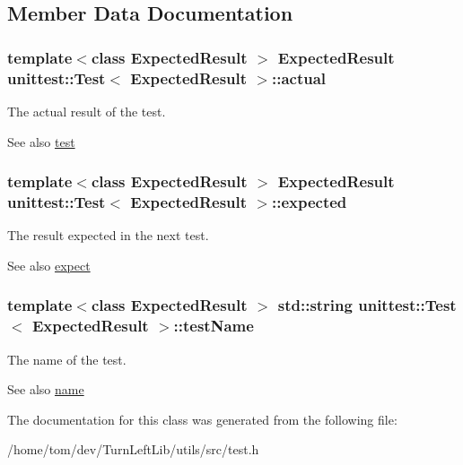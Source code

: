 \subsection{Member Data Documentation}
\hypertarget{classunittest_1_1Test_a94ffef90be10c89de6905724d007065e}{
\subsubsection[{actual}]{\setlength{\rightskip}{0pt plus 5cm}template$<$class ExpectedResult $>$ ExpectedResult {\bf unittest::Test}$<$ ExpectedResult $>$::{\bf actual}}}
\label{classunittest_1_1Test_a94ffef90be10c89de6905724d007065e}
The actual result of the test. \begin{DoxySeeAlso}{See also}
\hyperlink{classunittest_1_1Test_a68e6b4f7a18747533b9000640a8e0abb}{test} 
\end{DoxySeeAlso}
\hypertarget{classunittest_1_1Test_a4c5c14e9919c00b53f973cac370455b0}{
\subsubsection[{expected}]{\setlength{\rightskip}{0pt plus 5cm}template$<$class ExpectedResult $>$ ExpectedResult {\bf unittest::Test}$<$ ExpectedResult $>$::{\bf expected}}}
\label{classunittest_1_1Test_a4c5c14e9919c00b53f973cac370455b0}
The result expected in the next test. \begin{DoxySeeAlso}{See also}
\hyperlink{classunittest_1_1Test_a1903e808d53a1fd1c7550f8af6a0bdaf}{expect} 
\end{DoxySeeAlso}
\hypertarget{classunittest_1_1Test_a864ad88ceccb86bbf71b33582495dfac}{
\subsubsection[{testName}]{\setlength{\rightskip}{0pt plus 5cm}template$<$class ExpectedResult $>$ std::string {\bf unittest::Test}$<$ ExpectedResult $>$::{\bf testName}}}
\label{classunittest_1_1Test_a864ad88ceccb86bbf71b33582495dfac}
The name of the test. \begin{DoxySeeAlso}{See also}
\hyperlink{classunittest_1_1Test_a6a0f892a9db7f6c11b1b237f1b46e487}{name} 
\end{DoxySeeAlso}


The documentation for this class was generated from the following file:\begin{DoxyCompactItemize}
\item 
/home/tom/dev/TurnLeftLib/utils/src/test.h\end{DoxyCompactItemize}
